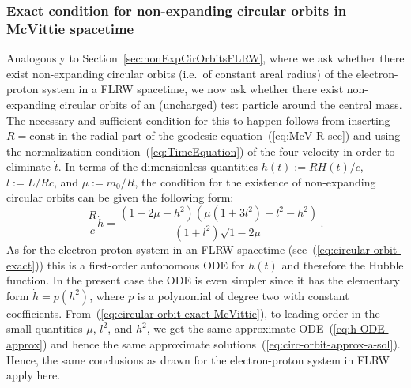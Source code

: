 \documentclass
[rmp,aps,twocolumn,showpacs,preprintnumbers,amsmath,amssymb]{revtex4}
\theoremstyle{plain}
\theoremstyle{definition}
\theoremstyle{remark}
\begin{document}
\subsubsection{Exact condition for non-expanding circular orbits in McVittie spacetime}
\label{sec:nonExpCirOrbitsMcVittie}
%
Analogously to Section~\ref{sec:nonExpCirOrbitsFLRW}, where we ask whether 
there exist non-expanding circular orbits (i.e.~of constant areal radius) 
of the electron-proton system in a FLRW spacetime, we now ask whether there 
exist non-expanding circular orbits of an (uncharged) test particle around 
the central mass. The necessary and sufficient condition for this to happen 
follows from inserting $R=\textrm{const}$ in the radial part of the geodesic 
equation~(\ref{eq:McV-R-sec}) and using the normalization 
condition~(\ref{eq:TimeEquation}) of the four-velocity in order to eliminate 
$\dot t$. In terms of the dimensionless quantities $h(t):=RH(t)/c$, 
$l:=L/Rc$, and $\mu:=m_0/R$, the condition for the existence of non-expanding 
circular orbits can be given the following form: 
%
\begin{equation}\label{eq:circular-orbit-exact-McVittie}
  \frac{R}{c}\dot h = 
  \frac{\left( 1-2\mu-h^2 \right)\left( \mu(1+3l^2)-l^2-h^2 \right) }
       {(1+l^2)\sqrt{1-2\mu}} \,.
\end{equation}
%
As for the electron-proton system in an FLRW spacetime 
(see~(\ref{eq:circular-orbit-exact})) this is a first-order autonomous 
ODE for $h(t)$ and therefore the Hubble function. In the present case 
the ODE is even simpler since it has the elementary form 
$\dot h=p(h^2)$, where $p$ is a polynomial of degree two with 
constant coefficients. From~(\ref{eq:circular-orbit-exact-McVittie}), 
to leading order in the small quantities $\mu$, $l^2$, and $h^2$, 
we get the same approximate ODE~(\ref{eq:h-ODE-approx}) and hence 
the same approximate solutions~(\ref{eq:circ-orbit-approx-a-sol}). 
Hence, the same conclusions as drawn for the electron-proton system 
in FLRW apply here. 
\end{document}
